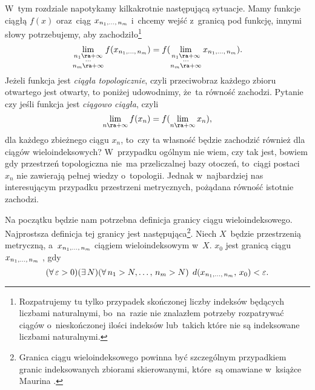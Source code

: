 \documentclass[a4paper,11pt]{article}
\begin{document}
\start {}
W~tym rozdziale napotykamy kilkakrotnie następującą sytuacje. Mamy
funkcje ciągłą $f( x )$ oraz~ciąg $x_{ n_{ 1 }, \ldots, \, n_{ m } }$
i~chcemy wejść z~granicą pod funkcję, innymi słowy potrzebujemy, aby
zachodziło\footnote{Rozpatrujemy tu tylko przypadek skończonej liczby
  indeksów będących liczbami naturalnymi, bo~na~razie nie znalazłem
  potrzeby rozpatrywać ciągów o~nieskończonej ilości indeksów
  lub~takich które nie są indeksowane liczbami naturalnymi.}
\begin{equation*}
  \Lim_{ \substack{ n_{ 1 } \ra +\infty \\ \cdots \\  n_{ m } \ra +\infty } }
  f( x_{ n_{ 1 }, \ld, \, n_{ m } } )
  = f( \Lim_{ \substack{ n_{ 1 } \ra +\infty \\ \cdots \\ n_{ m } \ra +\infty } }
  x_{ n_{ 1 }, \ld, \, n_{ m } } ).
\end{equation*}
Jeżeli funkcja jest \emph{ciągła topologicznie}, czyli przeciwobraz
każdego zbioru otwartego jest otwarty, to poniżej udowodnimy, że~ta
równość zachodzi. Pytanie czy jeśli funkcja jest \emph{ciągowo
  ciągła}, czyli
\begin{equation*}
  \Lim_{ n \ra +\infty } f( x_{ n } ) = f( \Lim_{ n \ra +\infty } x_{ n } ),
\end{equation*}
dla każdego zbieżnego ciągu $x_{ n }$, to~czy ta własność będzie
zachodzić również dla ciągów wieloindeksowych? W~przypadku ogólnym nie
wiem, czy tak jest, bowiem gdy przestrzeń topologiczna nie~ma
przeliczalnej bazy otoczeń, to~ciągi postaci $x_{ n }$ nie zawierają
pełnej wiedzy o~topologii. Jednak w~najbardziej nas interesującym
przypadku przestrzeni metrycznych, pożądana równość istotnie zachodzi.

Na początku będzie nam potrzebna definicja granicy ciągu
wieloindeksowego. Najprostsza definicja tej granicy jest
następująca\footnote{Granica ciągu wieloindeksowego powinna być
  szczególnym przypadkiem granic indeksowanych zbiorami skierowanymi,
  które~są omawiane w~książce Maurina \cite{Maurin74}.}. Niech
$X$~będzie przestrzenią metryczną, a~$x_{ n_{ 1 }, \ldots, \, n_{ m } }$
ciągiem wieloindeksowym w~$X$. $x_{ 0 }$ jest granicą ciągu
$x_{ n_{ 1 }, \ldots, \, n_{ m } }$ \wtw, gdy
\begin{equation*}
  ( \forall \, \varepsilon > 0) ( \exists \, N )
  ( \forall \, n_{ 1 } > N, \ldots, \, n_{ m } > N ) \;\,
  d( x_{ n_{ 1 }, \ldots, \, n_{ m } }, \, x_{ 0 } ) < \varepsilon.
\end{equation*}
\end{document}
